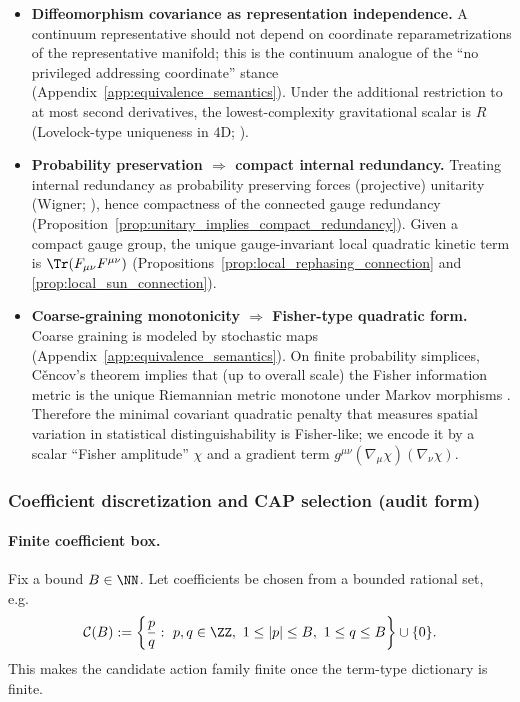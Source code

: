 \begin{itemize}
\item \textbf{Diffeomorphism covariance as representation independence.}
\InterfaceTag A continuum representative should not depend on coordinate reparametrizations of the representative manifold; this is the continuum analogue of the ``no privileged addressing coordinate'' stance (Appendix~\ref{app:equivalence_semantics}).
Under the additional restriction to at most second derivatives, the lowest-complexity gravitational scalar is $R$ (Lovelock-type uniqueness in $4$D; \cite{Lovelock1971}).

\item \textbf{Probability preservation $\Rightarrow$ compact internal redundancy.}
\InterfaceTag Treating internal redundancy as probability preserving forces (projective) unitarity (Wigner; \cite{Wigner1931}), hence compactness of the connected gauge redundancy (Proposition~\ref{prop:unitary_implies_compact_redundancy}).
Given a compact gauge group, the unique gauge-invariant local quadratic kinetic term is $\Tr(F_{\mu\nu}F^{\mu\nu})$ (Propositions~\ref{prop:local_rephasing_connection} and \ref{prop:local_sun_connection}).

\item \textbf{Coarse-graining monotonicity $\Rightarrow$ Fisher-type quadratic form.}
\InterfaceTag Coarse graining is modeled by stochastic maps (Appendix~\ref{app:equivalence_semantics}).
On finite probability simplices, C{\v{e}}ncov's theorem implies that (up to overall scale) the Fisher information metric is the unique Riemannian metric monotone under Markov morphisms \cite{Cencov1982}.
Therefore the minimal covariant quadratic penalty that measures spatial variation in statistical distinguishability is Fisher-like; we encode it by a scalar ``Fisher amplitude'' $\chi$ and a gradient term $g^{\mu\nu}(\nabla_\mu\chi)(\nabla_\nu\chi)$.
\end{itemize}

\subsubsection{Coefficient discretization and CAP selection (audit form)}
\label{subsec:cap_action_discretization}

\paragraph{Finite coefficient box.}
\AuditTag Fix a bound $B\in\NN$.
Let coefficients be chosen from a bounded rational set, e.g.\
\[
\mathcal{C}(B):=\left\{\frac{p}{q}:\ p,q\in\ZZ,\ 1\le |p|\le B,\ 1\le q\le B\right\}\cup\{0\}.
\]
This makes the candidate action family finite once the term-type dictionary is finite.


